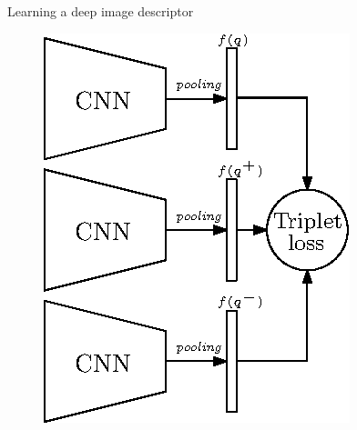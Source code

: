 \begin{frame}{Learning a deep image descriptor}
\begin{minipage}{0.49\linewidth}
\begin{minipage}[c]{0.26\linewidth}
			\vspace{0.1cm}
		\end{minipage}
		\begin{minipage}{0.7\linewidth}
			\vfill
			\begin{figure}
				\centering
				\includegraphics[width=\linewidth]{vect/triplet_loss.eps}

\end{figure}
\end{minipage}
\end{minipage}
\end{frame}
